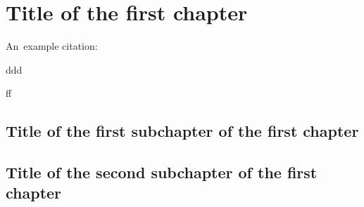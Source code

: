 \chapter{Title of the first chapter}

An~example citation: \cite{Andel07}


ddd

ff

\section{Title of the first subchapter of the first chapter}

\section{Title of the second subchapter of the first chapter}
